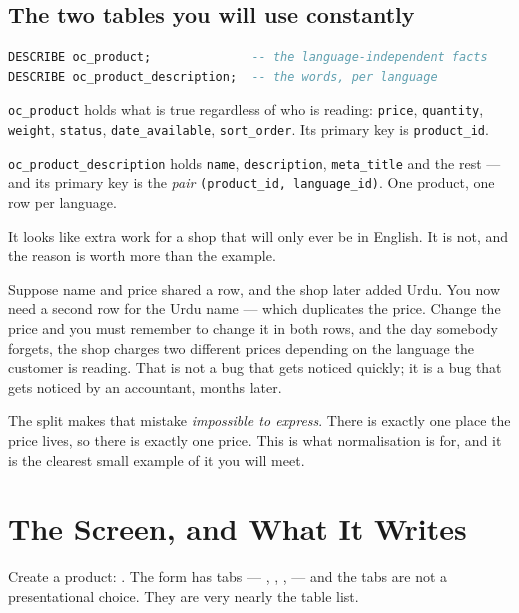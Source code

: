 \subsection{The two tables you will use constantly}

\begin{lstlisting}[language=sql]
DESCRIBE oc_product;              -- the language-independent facts
DESCRIBE oc_product_description;  -- the words, per language
\end{lstlisting}

\texttt{oc\_product} holds what is true regardless of who is reading:
\texttt{price}, \texttt{quantity}, \texttt{weight}, \texttt{status},
\texttt{date\_available}, \texttt{sort\_order}. Its primary key is
\texttt{product\_id}.

\texttt{oc\_product\_description} holds \texttt{name},
\texttt{description}, \texttt{meta\_title} and the rest --- and its primary key
is the \emph{pair} \texttt{(product\_id, language\_id)}. One product, one row
per language.

\begin{examplebox}
It looks like extra work for a shop that will only ever be in English. It is
not, and the reason is worth more than the example.

\smallskip
Suppose name and price shared a row, and the shop later added Urdu. You now
need a second row for the Urdu name --- which duplicates the price. Change the
price and you must remember to change it in both rows, and the day somebody
forgets, the shop charges two different prices depending on the language the
customer is reading. That is not a bug that gets noticed quickly; it is a bug
that gets noticed by an accountant, months later.

\smallskip
The split makes that mistake \emph{impossible to express}. There is exactly one
place the price lives, so there is exactly one price. This is what
normalisation is for, and it is the clearest small example of it you will meet.
\end{examplebox}

\section{The Screen, and What It Writes}

Create a product: . The form has tabs ---
, , ,  --- and the tabs are
not a presentational choice. They are very nearly the table list.

